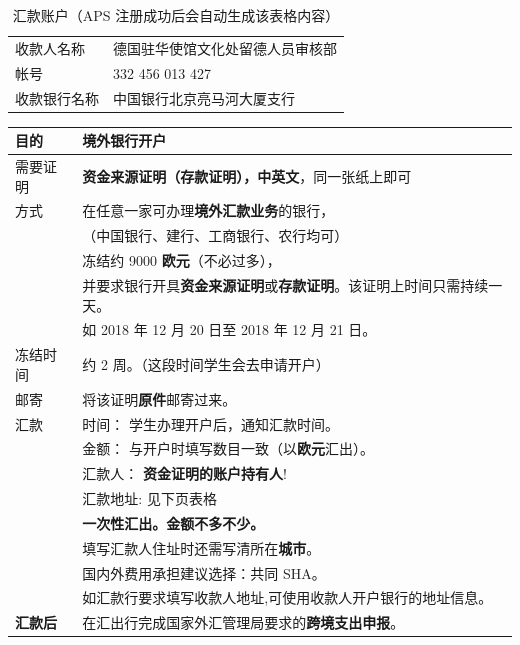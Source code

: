\documentclass{article}
\begin{document}
\newpage

\begin{table}[htbp]
  \caption{汇款账户（APS 注册成功后会自动生成该表格内容）}
  \label{tb:bank-account}
  \centering
  \begin{tabular}{ll}
    \toprule
    收款人名称 & 德国驻华使馆文化处留德人员审核部 \\
    帐号 & 332 456 013 427 \\
    收款银行名称 & 中国银行北京亮马河大厦支行 \\
    \bottomrule
  \end{tabular}
\end{table}

\begin{center}
\begin{tabular}{ll}
  \toprule
  目的 & 境外银行\textbf{开户} \\ \midrule
  需要证明 & \textbf{资金来源证明（存款证明），\color{blue}中英文}，同一张纸上即可 \\ \midrule
  方式 & 在任意一家可办理\textbf{\color{blue}境外汇款业务}的银行，\\
  & （中国银行、建行、工商银行、农行均可） \\
  & 冻结约 9000 \textbf{\color{blue}欧元}（不必过多）， \\
  & 并要求银行开具\textbf{资金来源证明}或\textbf{存款证明}。该证明上时间只需持续一天。 \\
  & 如 2018 年 12 月 20 日至 2018 年 12 月 21 日。 \\
  冻结时间 & 约 2 周。（这段时间学生会去申请开户） \\ \midrule
  邮寄 & 将该证明\textbf{原件}邮寄过来。 \\ \midrule
  汇款 & {\color{blue}时间}： 学生办理开户后，通知汇款时间。 \\
  & {\color{blue}金额}： 与开户时填写数目一致（以\textbf{\color{blue}欧元}汇出）。 \\
  & {\color{blue}汇款人}： \textbf{资金证明的账户\color{blue}持有人}! \\
  & {\color{blue}汇款地址}: 见下页表格 \\
  & \textbf{一次性汇出。金额不多不少。} \\
  & 填写汇款人住址时还需写清所在\textbf{城市}。 \\
  & 国内外费用承担建议选择：共同 SHA。 \\
  & 如汇款行要求填写收款人地址,可使用收款人开户银行的地址信息。 \\ \midrule
  \textbf{汇款后} & 在汇出行完成国家外汇管理局要求的\textbf{跨境支出申报}。 \\  
  \bottomrule
\end{tabular}
\end{center}
\end{document}
